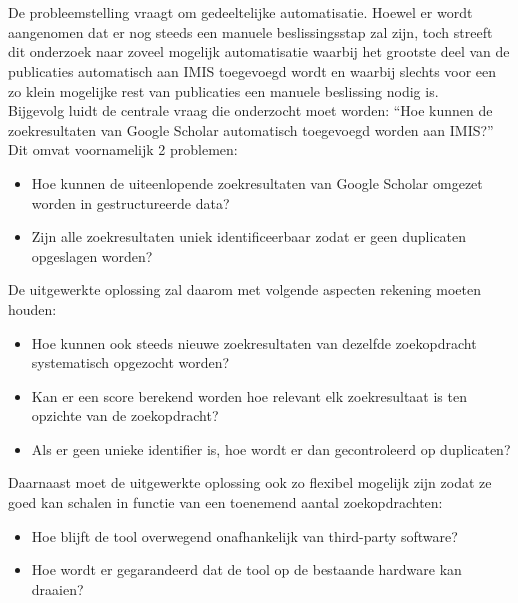 \section{}%
\label{sec:onderzoeksvraag}

De probleemstelling vraagt om gedeeltelijke automatisatie. Hoewel er wordt aangenomen dat er nog steeds een manuele beslissingsstap zal zijn, toch streeft dit onderzoek naar zoveel mogelijk automatisatie waarbij het grootste deel van de publicaties automatisch aan IMIS toegevoegd wordt en waarbij slechts voor een zo klein mogelijke rest van publicaties een manuele beslissing nodig is.\\
Bijgevolg luidt de centrale vraag die onderzocht moet worden: ``Hoe kunnen de zoekresultaten van Google Scholar automatisch toegevoegd worden aan IMIS?''
Dit omvat voornamelijk 2 problemen:
\begin{itemize}
    \item Hoe kunnen de uiteenlopende zoekresultaten van Google Scholar omgezet worden in gestructureerde data?
    \item Zijn alle zoekresultaten uniek identificeerbaar zodat er geen duplicaten opgeslagen worden?
\end{itemize}
De uitgewerkte oplossing zal daarom met volgende aspecten rekening moeten houden:
\begin{itemize}
    \item Hoe kunnen ook steeds nieuwe zoekresultaten van dezelfde zoekopdracht systematisch opgezocht worden?
    \item Kan er een score berekend worden hoe relevant elk zoekresultaat is ten opzichte van de zoekopdracht?
    \item Als er geen unieke identifier is, hoe wordt er dan gecontroleerd op duplicaten? 
\end{itemize}
Daarnaast moet de uitgewerkte oplossing ook zo flexibel mogelijk zijn zodat ze goed kan schalen in functie van een toenemend aantal zoekopdrachten:
\begin{itemize}
    \item Hoe blijft de tool overwegend onafhankelijk van third-party software?
    \item Hoe wordt er gegarandeerd dat de tool op de bestaande hardware kan draaien? 
\end{itemize}

\section{}%
\label{sec:onderzoeksdoelstelling}

